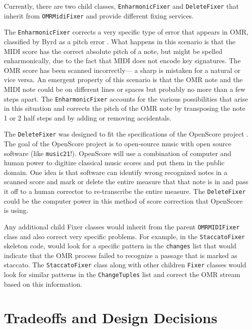 Currently, there are two child classes, \texttt{EnharmonicFixer} and \texttt{DeleteFixer} that inherit from \texttt{OMRMidiFixer} and provide different fixing services. 

The \texttt{EnharmonicFixer} corrects a very specific type of error that appears in OMR, classified by Byrd as a pitch error \cite{byrd-testbed}. What happens in this scenario is that the MIDI score has the correct absolute pitch of a note, but might be spelled enharmonically, due to the fact that MIDI does not encode key signatures. The OMR score has been scanned incorrectly--- a sharp is mistaken for a natural or vice versa. An emergent property of this scenario is that the OMR note and the MIDI note could be on different lines or spaces but probably no more than a few steps apart. The \texttt{EnharmonicFixer} accounts for the various possibilities that arise in this situation and corrects the pitch of the OMR note by transposing the note 1 or 2 half steps and by adding or removing accidentals.

The \texttt{DeleteFixer} was designed to fit the specifications of the OpenScore project \cite{openscore}. The goal of the OpenScore project is to open-source music with open source software (like \texttt{music21}!). OpenScore will use a combination of computer and human power to digitize classical music scores and put them in the public domain. One idea is that software can identify wrong recognized notes in a scanned score and mark or delete the entire measure that that note is in and pass it off to a human corrector to re-transcribe the entire measure. The \texttt{DeleteFixer} could be the computer power in this method of score correction that OpenScore is using.

Any additional child Fixer classes would inherit from the parent \texttt{OMRMIDIFixer} class and also correct very specific problems. For example, in the \texttt{StaccatoFixer} skeleton code, would look for a specific pattern in the \texttt{changes} list that would indicate that the OMR process failed to recognize a passage that is marked as staccato. The \texttt{StaccatoFixer} class along with other children \texttt{Fixer} classes would look for similar patterns in the \texttt{ChangeTuples} list and correct the OMR stream based on this information. 


\section{Tradeoffs and Design Decisions}

